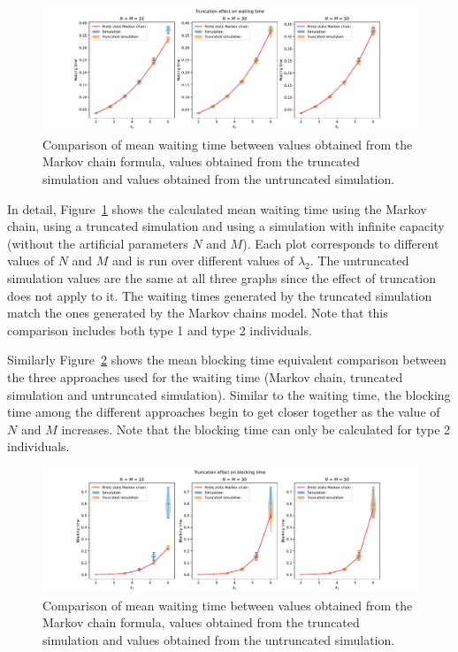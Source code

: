 \begin{figure}[H]
    \includegraphics[width=\textwidth]{chapters/03_queueing_model/img/numeric_results_and_timings/truncation_effect/waiting/demo.pdf}
    \caption{
        Comparison of mean waiting time between values obtained from the Markov 
        chain formula, values obtained from the truncated simulation and values
        obtained from the untruncated simulation.
    }
    \label{fig:markov_vs_des_waiting_time_comparison_overall}
\end{figure}

In detail, Figure~\ref{fig:markov_vs_des_waiting_time_comparison_overall} shows
the calculated mean waiting time using the Markov chain, using a truncated 
simulation and using a simulation with infinite capacity (without the artificial
parameters \(N\) and \(M\)).
Each plot corresponds to different values of \(N\) and \(M\) and is run over 
different values of \(\lambda_2\).
The untruncated simulation values are the same at all three graphs since
the effect of truncation does not apply to it.
The waiting times generated by the truncated simulation match the ones generated 
by the Markov chains model.
Note that this comparison includes both type 1 and type 2 individuals.


Similarly Figure~\ref{fig:markov_vs_des_blocking_time_comparison_overall} shows
the mean blocking time equivalent comparison between the three approaches used
for the waiting time (Markov chain, truncated simulation and untruncated
simulation).
Similar to the waiting time, the blocking time among the different approaches
begin to get closer together as the value of \(N\) and \(M\) increases.
Note that the blocking time can only be calculated for type 2 individuals.

\begin{figure}[H]
    \includegraphics[width=\textwidth]{chapters/03_queueing_model/img/numeric_results_and_timings/truncation_effect/blocking/demo.pdf}
    \caption{
        Comparison of mean waiting time between values obtained from the Markov 
        chain formula, values obtained from the truncated simulation and values
        obtained from the untruncated simulation.
    }
    \label{fig:markov_vs_des_blocking_time_comparison_overall}
\end{figure}

